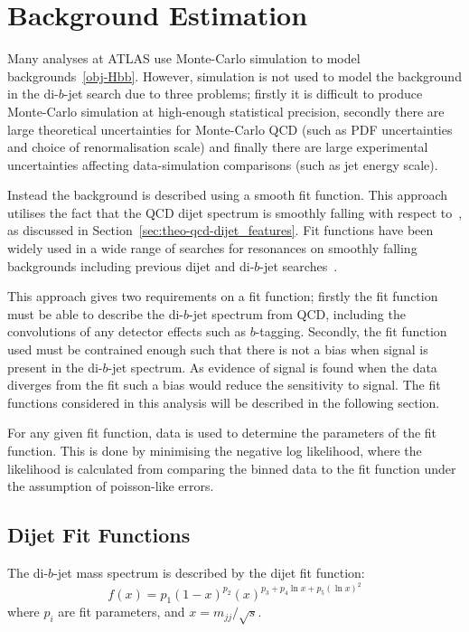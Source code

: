 \section{Background Estimation}
\label{sec:bkg-fit}

Many analyses at ATLAS use Monte-Carlo simulation
to model backgrounds~\ref{obj-Hbb}.
However, simulation is not used to model the
background in the di-$b$-jet search due to three problems;
firstly it is difficult to produce Monte-Carlo simulation at high-enough statistical precision,
secondly there are large theoretical uncertainties for Monte-Carlo QCD
(such as PDF uncertainties and choice of renormalisation scale)
and finally there are large experimental uncertainties affecting
data-simulation comparisons (such as jet energy scale).

Instead the background is described using a smooth fit function.
This approach utilises the fact that the QCD dijet spectrum
is smoothly falling with respect to~\mjj,
as discussed in Section~\ref{sec:theo-qcd-dijet_features}.
Fit functions have been widely used
in a wide range of searches for resonances on smoothly falling backgrounds
including previous dijet and di-$b$-jet searches~\cite{dijet-mori16_paper,dibjet-mori16_paper}.

This approach gives two requirements on a fit function;
firstly the fit function must be able to describe the di-$b$-jet spectrum from QCD,
including the convolutions of any detector effects such as $b$-tagging.
Secondly,  the fit function used must be contrained enough
such that there is not a bias when signal is present in the di-$b$-jet spectrum.
As evidence of signal is found when the data diverges from the fit
such a bias would reduce the sensitivity to signal.
The fit functions considered in this analysis will be described in the following section.

For any given fit function, 
data is used to determine the parameters of the fit function.
This is done by minimising the negative log likelihood,
where the likelihood is calculated from comparing
the binned data to the fit function
under the assumption of poisson-like errors.

\subsection{Dijet Fit Functions}
\label{sec:bkg-bkg_func}

The di-$b$-jet mass spectrum is described by the dijet fit function:
\begin{equation}
  f(x)=p_1(1-x)^{p_2}(x)^{p_3+p_4\ln{x}+p_5(\ln{x})^{2}}
\label{eqn:bkg-fit}
\end{equation}
where $p_i$ are fit parameters, and $x=m_{jj}/\sqrt{s}$.

